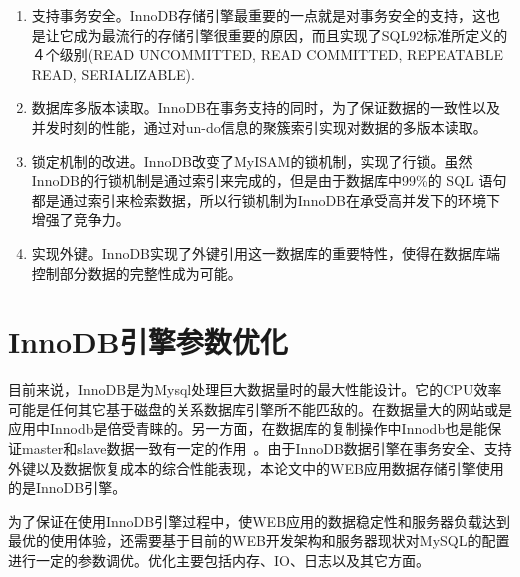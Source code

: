 \begin{enumerate}
\item 支持事务安全。InnoDB存储引擎最重要的一点就是对事务安全的支持，这也是让它成为最流行的存储引擎很重要的原因，而且实现了SQL92标准所定义的４个级别(READ UNCOMMITTED, READ COMMITTED, REPEATABLE READ, SERIALIZABLE).
\item 数据库多版本读取。InnoDB在事务支持的同时，为了保证数据的一致性以及并发时刻的性能，通过对un-do信息的聚簇索引实现对数据的多版本读取。
\item 锁定机制的改进。InnoDB改变了MyISAM的锁机制，实现了行锁。虽然InnoDB的行锁机制是通过索引来完成的，但是由于数据库中99\%的 SQL 语句都是通过索引来检索数据，所以行锁机制为InnoDB在承受高并发下的环境下增强了竞争力。
\item 实现外键。InnoDB实现了外键引用这一数据库的重要特性，使得在数据库端控制部分数据的完整性成为可能。
\end{enumerate}

\section{InnoDB引擎参数优化}

目前来说，InnoDB是为Mysql处理巨大数据量时的最大性能设计。它的CPU效率可能是任何其它基于磁盘的关系数据库引擎所不能匹敌的。在数据量大的网站或是应用中Innodb是倍受青睐的。另一方面，在数据库的复制操作中Innodb也是能保证master和slave数据一致有一定的作用~\cite{schwartz2012high}。由于InnoDB数据引擎在事务安全、支持外键以及数据恢复成本的综合性能表现，本论文中的WEB应用数据存储引擎使用的是InnoDB引擎。

为了保证在使用InnoDB引擎过程中，使WEB应用的数据稳定性和服务器负载达到最优的使用体验，还需要基于目前的WEB开发架构和服务器现状对MySQL的配置进行一定的参数调优。优化主要包括内存、IO、日志以及其它方面\cite{顾治华2006mysql}。

